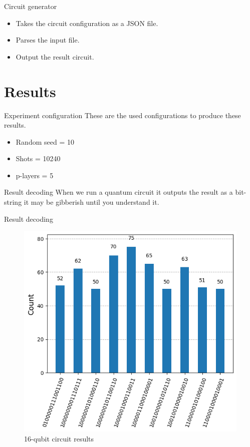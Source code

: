 \documentclass[14pt, aspectratio=169]{beamer}
\begin{document}
\begin{frame}{Circuit generator}
    \begin{itemize}
        \item Takes the circuit configuration as a JSON file.
        \item Parses the input file.
        \item Output the result circuit.
    \end{itemize}
\end{frame}

\section{Results}

\begin{frame}{Experiment configuration}
    These are the used configurations to produce these results.\\
    \begin{itemize}
        \item Random seed = 10
        \item Shots = 10240
        \item p-layers = 5
    \end{itemize}
\end{frame}

\begin{frame}{Result decoding}
    When we run a quantum circuit it outputs the result as a bit-string it may be gibberish until you understand it.\\
\end{frame}

\begin{frame}{Result decoding}
    \begin{figure}
        \centering
        \includegraphics[width=0.40\linewidth]{images/illustration/16_qubit_hitsto.png}
        \caption{16-qubit circuit results}
        \label{fig:16_qubit_result}
    \end{figure}
\end{frame}
\end{document}
